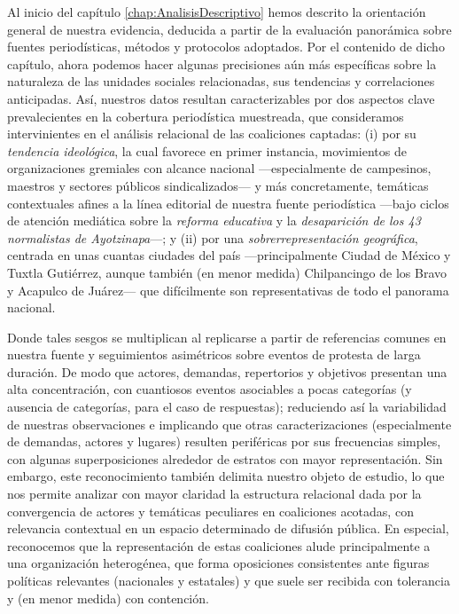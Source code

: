 \documentclass[letterpaper, 11pt]{book}
\theoremstyle{definition}
\theoremstyle{remark}
\begin{document}
Al inicio del capítulo \ref{chap:AnalisisDescriptivo} hemos descrito la orientación general de nuestra evidencia, deducida a partir de la evaluación panorámica sobre fuentes periodísticas, métodos y protocolos adoptados. 
Por el contenido de dicho capítulo, ahora podemos hacer algunas precisiones aún más específicas sobre la naturaleza de las unidades sociales relacionadas, sus tendencias y correlaciones anticipadas. 
Así, nuestros datos resultan caracterizables por dos aspectos clave prevalecientes en la cobertura periodística muestreada, que consideramos intervinientes en el análisis relacional de las coaliciones captadas: 
(i) por su \emph{tendencia ideológica}, la cual favorece en primer instancia, movimientos de organizaciones gremiales con alcance nacional ---especialmente de campesinos, maestros y sectores públicos sindicalizados--- y más concretamente, temáticas contextuales afines a la línea editorial de nuestra fuente periodística ---bajo ciclos de atención mediática sobre la \emph{reforma educativa} y la \emph{desaparición de los 43 normalistas de Ayotzinapa}---; 
y (ii) por una \emph{sobrerrepresentación geográfica}, centrada en unas cuantas ciudades del país ---principalmente Ciudad de México y Tuxtla Gutiérrez, aunque también (en menor medida) Chilpancingo de los Bravo y Acapulco de Juárez--- que difícilmente son representativas de todo el panorama nacional.


Donde tales sesgos se multiplican al replicarse a partir de referencias comunes en nuestra fuente y seguimientos asimétricos sobre eventos de protesta de larga duración. 
De modo que actores, demandas, repertorios y objetivos presentan una alta concentración, con cuantiosos eventos asociables a pocas categorías (y ausencia de categorías, para el caso de respuestas); reduciendo así la variabilidad de nuestras observaciones e implicando que otras caracterizaciones (especialmente de demandas, actores y lugares) resulten periféricas por sus frecuencias simples, con algunas superposiciones alrededor de estratos con mayor representación. 
Sin embargo, este reconocimiento también delimita nuestro objeto de estudio, lo que nos permite analizar con mayor claridad la estructura relacional dada por la convergencia de actores y temáticas peculiares en coaliciones acotadas, con relevancia contextual en un espacio determinado de difusión pública. 
En especial, reconocemos que la representación de estas coaliciones alude principalmente a una organización heterogénea, que forma oposiciones consistentes ante figuras políticas relevantes (nacionales y estatales) y que suele ser recibida con tolerancia y (en menor medida) con contención. 
\end{document}
